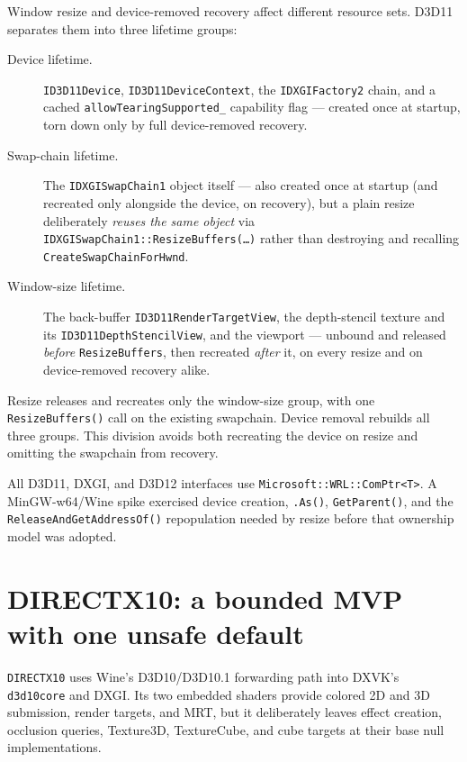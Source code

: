 Window resize and device-removed recovery affect different resource sets. D3D11 separates them
into three lifetime groups:

\begin{description}
  \item[Device lifetime.] \texttt{ID3D11Device}, \texttt{ID3D11DeviceContext}, the
        \texttt{IDXGIFactory2} chain, and a cached \texttt{allowTearingSupported\_} capability
        flag --- created once at startup, torn down only by full device-removed recovery.
  \item[Swap-chain lifetime.] The \texttt{IDXGISwapChain1} object itself --- also created once
        at startup (and recreated only alongside the device, on recovery), but a plain resize
        deliberately \emph{reuses the same object} via
        \texttt{IDXGISwapChain1::ResizeBuffers(\ldots{})} rather than destroying and
        recalling \texttt{CreateSwapChainForHwnd}.
  \item[Window-size lifetime.] The back-buffer \texttt{ID3D11RenderTargetView}, the
        depth-stencil texture and its \texttt{ID3D11DepthStencilView}, and the viewport ---
        unbound and released \emph{before} \texttt{ResizeBuffers}, then recreated
        \emph{after} it, on every resize and on device-removed recovery alike.
\end{description}

Resize releases and recreates only the window-size group, with one \texttt{ResizeBuffers()} call
on the existing swapchain. Device removal rebuilds all three groups. This division avoids both
recreating the device on resize and omitting the swapchain from recovery.

All D3D11, DXGI, and D3D12 interfaces use \texttt{Microsoft::WRL::ComPtr<T>}. A MinGW-w64/Wine
spike exercised device creation, \texttt{.As()}, \texttt{GetParent()}, and the
\texttt{ReleaseAndGetAddressOf()} repopulation needed by resize before that ownership model was
adopted.

\section{DIRECTX10: a bounded MVP with one unsafe default}

\texttt{DIRECTX10} uses Wine's D3D10/D3D10.1 forwarding path into DXVK's
\texttt{d3d10core} and DXGI.  Its two embedded shaders provide colored 2D and 3D submission,
render targets, and MRT, but it deliberately leaves effect creation, occlusion queries,
Texture3D, TextureCube, and cube targets at their base null implementations.

